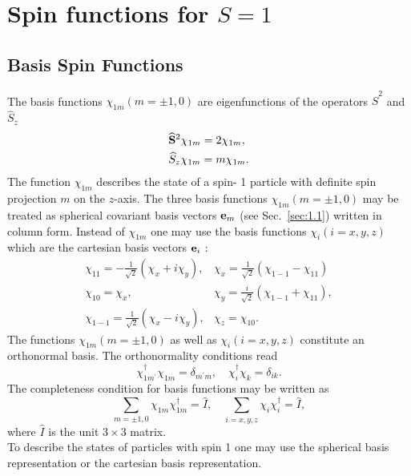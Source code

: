 \section{Spin functions for $S=1$}\label{sec:6.3}
\subsection{Basis Spin Functions}\label{sec:6.3.1}
The basis functions $\chi_{1 m}(m= \pm 1,0)$ are eigenfunctions of the operators $\widehat{S}^{2}$ and $\widehat{S}_{z}$
\begin{align}
& \widehat{\mathbf{S}}^{2} \chi_{1 m}=2 \chi_{1 m}, \label{eq:6:3:1}\\
& \widehat{S}_{z} \chi_{1 m}=m \chi_{1 m} . \notag
\end{align}
The function $\chi_{1 m}$ describes the state of a spin- 1 particle with definite spin projection $m$ on the $z$-axis. The three basis functions $\chi_{1 m}(m= \pm 1,0)$ may be treated as spherical covariant basis vectors $\mathbf{e}_{m}$ (see Sec.~\ref{sec:1.1}) written in column form. Instead of $\chi_{1 m}$ one may use the basis functions $\chi_{i}(i=x, y, z)$ which are the cartesian basis vectors $\mathbf{e}_{i}$ :
\begin{equation}
\begin{array}{ll}
\chi_{11}=-\frac{1}{\sqrt{2}}\left(\chi_{x}+i \chi_{y}\right), & \chi_{x}=\frac{1}{\sqrt{2}}\left(\chi_{1-1}-\chi_{11}\right) \\
\chi_{10}=\chi_{x}, & \chi_{y}=\frac{i}{\sqrt{2}}\left(\chi_{1-1}+\chi_{11}\right), \label{eq:6:3:2}\\
\chi_{1-1}=\frac{1}{\sqrt{2}}\left(\chi_{x}-i \chi_{y}\right), & \chi_{z}=\chi_{10} .
\end{array}
\end{equation}
The functions $\chi_{1 m}(m= \pm 1,0)$ as well as $\chi_{i}(i=x, y, z)$ constitute an orthonormal basis. The orthonormality conditions read
\begin{equation}
\chi_{1 m^{\prime}}^{\dagger} \chi_{1 m}=\delta_{m^{\prime} m}, \quad \chi_{i}^{\dagger} \chi_{k}=\delta_{i k} . \label{eq:6:3:3}
\end{equation}
The completeness condition for basis functions may be written as
\begin{equation}
\sum_{m= \pm 1,0} \chi_{1 m} \chi_{1 m}^{\dagger}=\widehat{I}, \quad \sum_{i=x, y, z} \chi_{i} \chi_{i}^{\dagger}=\widehat{I}, \label{eq:6:3:4}
\end{equation}
where $\widehat{I}$ is the unit $3 \times 3$ matrix.\\
To describe the states of particles with spin 1 one may use the spherical basis representation or the cartesian basis representation.

